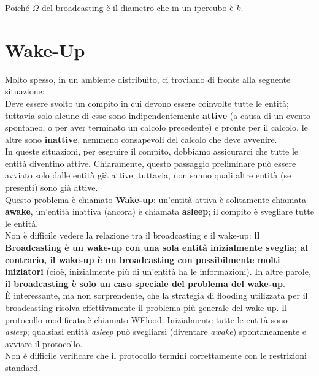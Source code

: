 
Poiché $\Omega$ del broadcasting è il diametro che in un ipercubo è $k$.



\chapter{Wake-Up}
Molto spesso, in un ambiente distribuito, ci troviamo di fronte alla seguente situazione:\\
Deve essere svolto un compito in cui devono essere coinvolte tutte le entità; tuttavia solo alcune di esse sono indipendentemente \textbf{attive} (a causa di un evento spontaneo, o per aver terminato un calcolo precedente) e pronte per il calcolo, le altre sono \textbf{inattive}, nemmeno consapevoli del calcolo che deve avvenire. \\
In queste situazioni, per eseguire il compito, dobbiamo assicurarci che tutte le entità diventino attive. Chiaramente, questo passaggio preliminare può essere avviato solo dalle entità già attive; tuttavia, non sanno quali altre entità (se presenti) sono già attive.\\
Questo problema è chiamato \textbf{Wake-up}: un'entità attiva è solitamente chiamata \textbf{awake}, un'entità inattiva (ancora) è chiamata \textbf{asleep}; il compito è svegliare tutte le entità.\\
Non è difficile vedere la relazione tra il broadcasting e il wake-up: \textbf{il Broadcasting è un wake-up con una sola entità inizialmente sveglia; al contrario, il wake-up è un broadcasting con possibilmente molti iniziatori} (cioè, inizialmente più di un'entità ha le informazioni). In altre parole, \textbf{il broadcasting è solo un caso speciale del problema del wake-up}.\\
È interessante, ma non sorprendente, che la strategia di flooding utilizzata per il broadcasting risolva effettivamente il problema più generale del wake-up. Il protocollo modificato è chiamato WFlood. Inizialmente tutte le entità sono \textit{asleep}; qualsiasi entità \textit{asleep} può svegliarsi (diventare \textit{awake}) spontaneamente e avviare il protocollo.\\
Non è difficile verificare che il protocollo termini correttamente con le restrizioni standard. \vspace{1cm}\\

